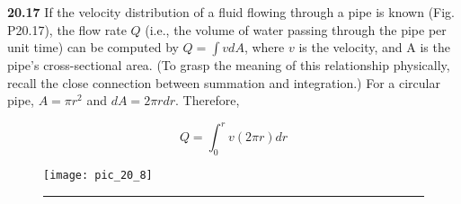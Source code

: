 \documentclass[../main.tex]{subfiles}
\begin{document}
\begin{multicols}{2}
\textbf{20.17} If the velocity distribution of a fluid flowing through
a pipe is known (Fig. P20.17), the flow rate $Q$ (i.e., the volume of water passing through the pipe per unit time) can be
computed by $Q = \int v dA$, where $v$ is the velocity, and A is
the pipe's cross-sectional area. (To grasp the meaning of this
relationship physically, recall the close connection between
summation and integration.) For a circular pipe, $A = \pi r^{2}$ and $dA = 2 \pi r dr$. Therefore,

	$$Q = \int^{r}_{0} v(2 \pi r) dr$$
	



\end{multicols}

\begin{figure}[hbt!]
	\texttt{[image: pic\_20\_8]}
	\caption{} \hrule
	\label{pic.20.8}
\end{figure}
\end{document}
